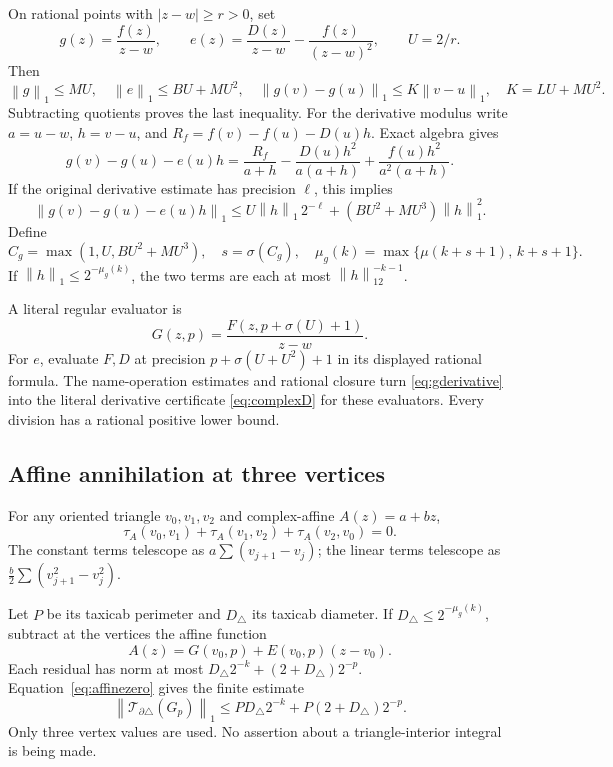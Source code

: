 \documentclass[11pt]{article}
\theoremstyle{definition}
\newcommand{\norm}[1]{\left\lVert#1\right\rVert_1}
\newcommand{\Trap}{\mathcal T}
\begin{document}
On rational points with \(|z-w|\ge r>0\), set
\[
 g(z)=\frac{f(z)}{z-w},\qquad
 e(z)=\frac{D(z)}{z-w}-\frac{f(z)}{(z-w)^2},\qquad U=2/r.
\]
Then
\begin{equation}\label{eq:gconstants}
 \norm g\le MU,\quad \norm e\le BU+MU^2,\quad
 \norm{g(v)-g(u)}\le K\norm{v-u},\quad K=LU+MU^2.
\end{equation}
Subtracting quotients proves the last inequality.
For the derivative modulus write \(a=u-w\), \(h=v-u\), and
\(R_f=f(v)-f(u)-D(u)h\). Exact algebra gives
\begin{equation}\label{eq:quotient}
 g(v)-g(u)-e(u)h=
 \frac{R_f}{a+h}-\frac{D(u)h^2}{a(a+h)}
                    +\frac{f(u)h^2}{a^2(a+h)}.
\end{equation}
If the original derivative estimate has precision \(\ell\), this implies
\begin{equation}\label{eq:gderivative}
 \norm{g(v)-g(u)-e(u)h}
 \le U\norm h\,2^{-\ell}+(BU^2+MU^3)\norm h^2.
\end{equation}
Define
\begin{equation}\label{eq:gmodulus}
 C_g=\max(1,U,BU^2+MU^3),\quad s=\sigma(C_g),\quad
 \mu_g(k)=\max\{\mu(k+s+1),\,k+s+1\}.
\end{equation}
If \(\norm h\le2^{-\mu_g(k)}\), the two terms are each at most
\(\norm h2^{-k-1}\).

A literal regular evaluator is
\[
 G(z,p)=\frac{F(z,p+\sigma(U)+1)}{z-w}.
\]
For \(e\), evaluate \(F,D\) at precision
\(p+\sigma(U+U^2)+1\) in its displayed rational formula.
The name-operation estimates and rational closure turn
\eqref{eq:gderivative} into the literal derivative certificate
\eqref{eq:complexD} for these evaluators. Every division has a rational
positive lower bound.

\subsection{Affine annihilation at three vertices}\label{sec:affine}

For any oriented triangle \(v_0,v_1,v_2\) and complex-affine
\(A(z)=a+bz\),
\begin{equation}\label{eq:affinezero}
 \tau_A(v_0,v_1)+\tau_A(v_1,v_2)+\tau_A(v_2,v_0)=0.
\end{equation}
The constant terms telescope as \(a\sum(v_{j+1}-v_j)\); the linear
terms telescope as \(\frac b2\sum(v_{j+1}^2-v_j^2)\).

Let \(P\) be its taxicab perimeter and \(D_\triangle\) its taxicab
diameter. If \(D_\triangle\le2^{-\mu_g(k)}\), subtract at the vertices the
affine function
\[
 A(z)=G(v_0,p)+E(v_0,p)(z-v_0).
\]
Each residual has norm at most
\(D_\triangle2^{-k}+(2+D_\triangle)2^{-p}\).
Equation~\eqref{eq:affinezero} gives the finite estimate
\begin{equation}\label{eq:triangle}
 \norm{\Trap_{\partial\triangle}(G_p)}
 \le PD_\triangle2^{-k}+P(2+D_\triangle)2^{-p}.
\end{equation}
Only three vertex values are used. No assertion about a triangle-interior
integral is being made.
\end{document}
